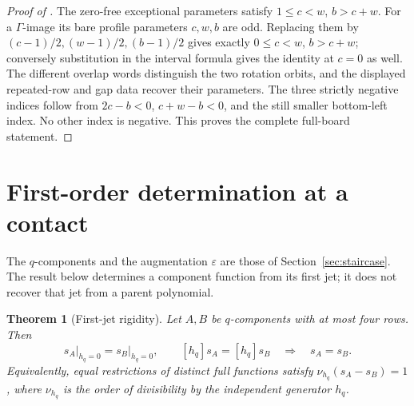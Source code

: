 \documentclass[11pt,a4paper]{amsart}
\numberwithin{equation}{section}
\theoremstyle{plain}
\newtheorem{theorem}{Theorem}[section]
\theoremstyle{definition}
\begin{document}
\begin{proof}[Proof of ]
The zero-free exceptional parameters satisfy \(1\le c<w\), \(b>c+w\).
For a \(\Gamma\)-image its bare profile parameters \(c,w,b\) are odd.
Replacing them by \((c-1)/2,(w-1)/2,(b-1)/2\) gives exactly
\(0\le c<w\), \(b>c+w\); conversely substitution in the interval
formula gives the identity at \(c=0\) as well.
The different overlap words distinguish the two rotation orbits, and
the displayed repeated-row and gap data recover their parameters.
The three strictly negative indices follow from
\(2c-b<0\), \(c+w-b<0\), and the still smaller bottom-left index.
No other index is negative.  This proves the complete full-board statement.
\end{proof}

\section{First-order determination at a contact}\label{app:contact-first-jet}

The \(q\)-components and the augmentation \(\varepsilon\) are those
of Section~\ref{sec:staircase}.  The result below determines a component
function from its first jet; it does not recover that jet from a parent
polynomial.

\begin{theorem}[First-jet rigidity]\label{thm:staircase-first-jet}
Let \(A,B\) be \(q\)-components with at most four rows.  Then
\[
 s_A\big|_{h_q=0}=s_B\big|_{h_q=0},\qquad
 [h_q]s_A=[h_q]s_B
 \quad\Longrightarrow\quad s_A=s_B.
\]
Equivalently, equal restrictions of distinct full functions satisfy
\(\nu_{h_q}(s_A-s_B)=1\), where \(\nu_{h_q}\) is the order of
divisibility by the independent generator \(h_q\).
\end{theorem}
\end{document}
